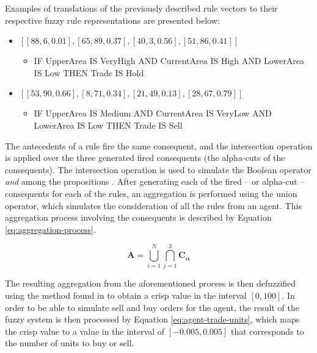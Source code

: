 Examples of translations of the previously described rule vectors to their respective fuzzy rule representations are presented below:

\begin{itemize}
	\item $[[88, 6, 0.01], [65, 89, 0.37], [40, 3, 0.56], [51, 86, 0.41]]$
	\begin{itemize}
    	\item IF UpperArea IS VeryHigh AND CurrentArea IS High AND LowerArea IS Low THEN Trade IS Hold 
    \end{itemize}
    \item $[[53, 90, 0.66], [8, 71, 0.34], [21, 49, 0.13], [28, 67, 0.79]]$
	\begin{itemize}
    	\item IF UpperArea IS Medium AND CurrentArea IS VeryLow AND LowerArea IS Low THEN Trade IS Sell 
    \end{itemize}
\end{itemize}


The antecedents of a rule fire the same consequent, and the intersection
operation is applied over the three generated fired consequents (the alpha-cuts
of the consequents). The intersection operation is used to simulate the Boolean
operator \textit{and} among the propositions \cite{Atanassov1986}. After
generating each of the fired -- or alpha-cut -- consequents for each of the rules,
an aggregation is performed using the union operator, which simulates the
consideration of all the rules from an agent. This aggregation process involving
the consequents is described by Equation \ref{eq:aggregation-process}.

\begin{equation}
  \label{eq:aggregation-process}
  \bm{A} = \bigcup\limits_{i=1}^{N} \bigcap\limits_{j=1}^{3} \bm{C_{\alpha}}
\end{equation}

The resulting aggregation from the aforementioned process is then
defuzzified using the method found in \cite{Hernandez-Aguila2017} to obtain a
crisp value in the interval $[0, 100]$. In order to be able to simulate sell and
buy orders for the agent, the result of the fuzzy system is then processed by
Equation \ref{eq:agent-trade-units}, which maps the crisp value to a value in the
interval of $[-0.005, 0.005]$ that corresponds to the number of units to buy or
sell.


